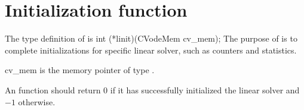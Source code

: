 
\section{Initialization function}
The type definition of  is
{
  int (*linit)(CVodeMem cv\_mem);
}
{
  The purpose of  is to complete initializations for      
  specific linear solver, such as counters and statistics.        
}
{
  \begin{args}[cv\_mem]
  \item[cv\_mem]
    is the {\cvode} memory pointer of type .
  \end{args}
}
{
  An  function should return $0$ if it 
  has successfully initialized the {\cvode} linear solver and 
  $-1$ otherwise. 
}
{}


